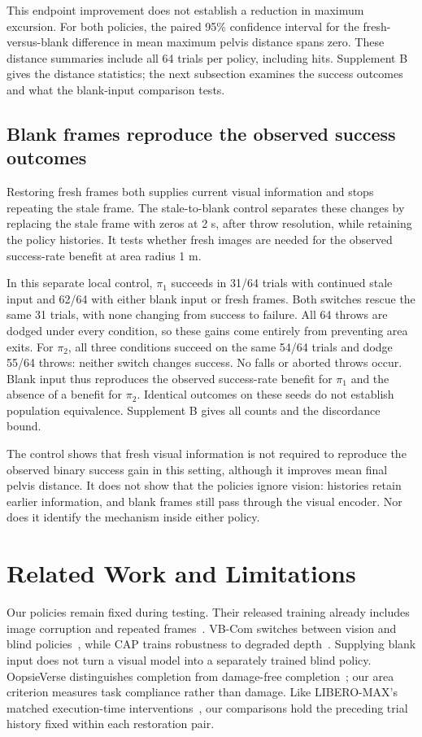 \documentclass[conference]{IEEEtran}
\begin{document}
This endpoint improvement does not establish a reduction in maximum excursion.
For both policies, the paired 95\% confidence interval for the fresh-versus-blank
difference in mean maximum pelvis distance spans zero. These distance summaries
include all 64 trials per policy, including hits. Supplement B gives the
distance statistics; the next subsection examines the success outcomes and
what the blank-input comparison tests.

\subsection{Blank frames reproduce the observed success outcomes}
Restoring fresh frames both supplies current visual information and stops
repeating the stale frame. The stale-to-blank control separates these changes
by replacing the stale frame with zeros at 2 s, after throw resolution, while
retaining the policy histories. It tests whether fresh images are needed for
the observed success-rate benefit at area radius 1 m.

In this separate local control, $\pi_1$ succeeds in 31/64 trials with
continued stale input and 62/64 with either blank input or fresh frames. Both
switches rescue the same 31 trials, with none changing from success to failure.
All 64 throws are dodged under every condition, so these gains come entirely
from preventing area exits. For $\pi_2$, all three conditions succeed on the
same 54/64 trials and dodge 55/64 throws: neither switch changes success.
No falls or aborted throws occur. Blank input thus reproduces the observed
success-rate benefit for $\pi_1$ and the absence of a benefit for $\pi_2$.
Identical outcomes on these seeds do not establish population equivalence.
Supplement B gives all counts and the discordance bound.

The control shows that fresh visual information is not required to reproduce
the observed binary success gain in this setting, although it improves mean
final pelvis distance. It does not show that the policies ignore vision:
histories retain earlier information, and blank frames still pass through the
visual encoder. Nor does it identify the mechanism inside either policy.

\section{Related Work and Limitations}
Our policies remain fixed during testing. Their released training already
includes image corruption and repeated frames~\cite{depthrelease}. VB-Com
switches between vision and blind policies~\cite{vbcom}, while CAP trains
robustness to degraded depth~\cite{cap}. Supplying blank input does not turn a
visual model into a separately trained blind policy. OopsieVerse distinguishes
completion from damage-free completion~\cite{oopsieverse}; our area criterion
measures task compliance rather than damage. Like LIBERO-MAX's matched
execution-time interventions~\cite{liberomax}, our comparisons hold the preceding
trial history fixed within each restoration pair.
\end{document}
